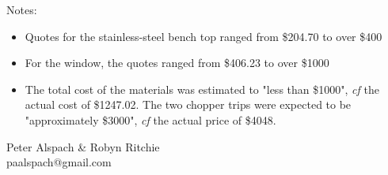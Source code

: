 \documentclass[12pt]{article} %
\begin{document}
Notes:

\begin{itemize}
 \item Quotes for the stainless-steel bench top ranged from \$204.70 to over \$400
 \item For the window, the quotes ranged from \$406.23 to over \$1000
 \item The total cost of the materials was estimated to "less than \$1000", \textit{cf} the actual cost of \$1247.02.  The two chopper trips were expected to be "approximately \$3000", \textit{cf} the actual price of \$4048.
\end{itemize}

\vspace{2cm}
Peter Alspach \& Robyn Ritchie\\
paalspach@gmail.com
\end{document}
